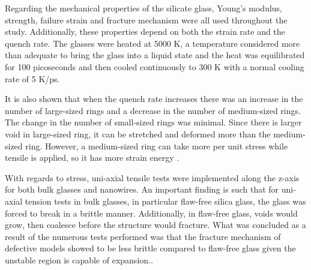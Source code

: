 \begin{itemize}
Regarding the mechanical properties of the silicate glass, Young's modulus, strength, failure strain and fracture mechanism were all used throughout the study.  Additionally, these properties depend on both the strain rate and the quench rate. The glasses were heated at 5000 K, a temperature considered more than adequate to bring the glass into a liquid state and the heat was equilibrated for 100 picoseconds and then cooled continuously to 300 K with a normal cooling rate of 5 K/ps.

It is also shown that when the quench rate increases there was an increase in the number of large-sized rings and a decrease in the number of medium-sized rings. The change in the number of small-sized rings was minimal. Since there is larger void in large-sized ring, it can be stretched and deformed more than the medium-sized ring. However, a medium-sized ring can take more per unit stress while tensile is applied, so it has more strain energy \cite{mWilson_continuum_stress}.

With regards to stress, uni-axial tensile tests were implemented along the z-axis for both bulk glasses and nanowires. An important finding is such that for uni-axial tension tests in bulk glasses, in particular flaw-free silica glass, the glass was forced to break in a brittle manner. Additionally, in flaw-free glass, voids would grow, then coalesce before the structure would fracture. What was concluded as a result of the numerous tests performed was that the fracture mechanism of defective models showed to be less brittle compared to flaw-free glass given the unstable region is capable of expansion.\cite{radialDistribution}.
\end{itemize}

